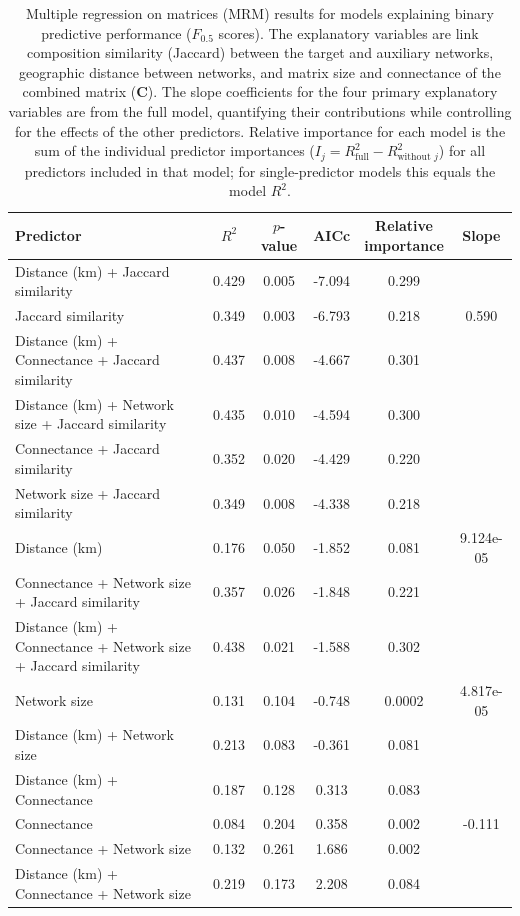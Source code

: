 \documentclass[oneside, a4paper, onecolumn, 11pt]{article}
\newcommand{\revtag}[1]{\textcolor{softcoral}{[#1]}}
\begin{document}
\begin{table}[H]
\footnotesize
\centering
\begin{tabular}{lccccc}
\hline
Predictor & $R^2$ & $p$-value & AICc & \makecell{Relative\\importance} & Slope \\
\hline
Distance (km) + Jaccard similarity & 0.429 & 0.005 & -7.094 & 0.299 &  \\
Jaccard similarity & 0.349 & 0.003 & -6.793 & 0.218 & 0.590 \\
Distance (km) + Connectance + Jaccard similarity & 0.437 & 0.008 & -4.667 & 0.301 &  \\
Distance (km) + Network size + Jaccard similarity & 0.435 & 0.010 & -4.594 & 0.300 &  \\
Connectance + Jaccard similarity & 0.352 & 0.020 & -4.429 & 0.220 &  \\
Network size + Jaccard similarity & 0.349 & 0.008 & -4.338 & 0.218 &  \\
Distance (km) & 0.176 & 0.050 & -1.852 & 0.081 & 9.124e-05 \\
Connectance + Network size + Jaccard similarity & 0.357 & 0.026 & -1.848 & 0.221 &  \\
Distance (km) + Connectance + Network size + Jaccard similarity & 0.438 & 0.021 & -1.588 & 0.302 &  \\
Network size & 0.131 & 0.104 & -0.748 & 0.0002 & 4.817e-05 \\
Distance (km) + Network size & 0.213 & 0.083 & -0.361 & 0.081 &  \\
Distance (km) + Connectance & 0.187 & 0.128 & 0.313 & 0.083 &  \\
Connectance & 0.084 & 0.204 & 0.358 & 0.002 & -0.111 \\
Connectance + Network size & 0.132 & 0.261 & 1.686 & 0.002 &  \\
Distance (km) + Connectance + Network size & 0.219 & 0.173 & 2.208 & 0.084 &  \\
\hline
\end{tabular}
\caption{Multiple regression on matrices (MRM) results for models explaining binary predictive performance ($F_{0.5}$ scores). The explanatory variables are link composition similarity (Jaccard) between the target and auxiliary networks, geographic distance between networks, and matrix size and connectance of the combined matrix ($\mathbf{C}$). The slope coefficients for the four primary explanatory variables are from the full model, quantifying their contributions while controlling for the effects of the other predictors. Relative importance for each model is the sum of the individual predictor importances ($I_j = R^2_{\text{full}} - R^2_{\text{without }j}$) for all predictors included in that model; for single-predictor models this equals the model $R^2$.}%
\label{tab:mrm_models}
\end{table}
\end{document}
